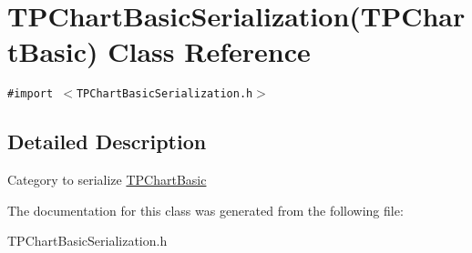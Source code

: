 \hypertarget{interface_t_p_chart_basic_serialization_07_t_p_chart_basic_08}{
\section{TPChartBasicSerialization(TPChartBasic) Class Reference}
\label{interface_t_p_chart_basic_serialization_07_t_p_chart_basic_08}
}
{\tt \#import $<$TPChartBasicSerialization.h$>$}



\subsection{Detailed Description}
Category to serialize \hyperlink{interface_t_p_chart_basic}{TPChartBasic} 

The documentation for this class was generated from the following file:\begin{CompactItemize}
\item 
TPChartBasicSerialization.h\end{CompactItemize}
